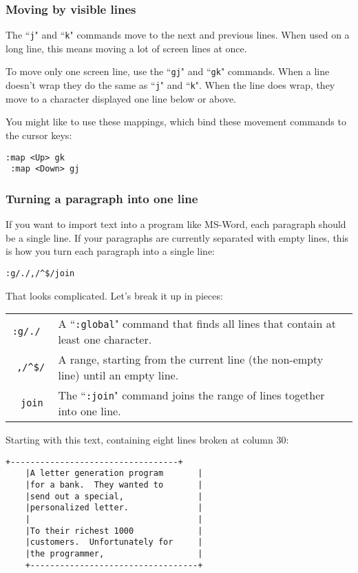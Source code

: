 \subsubsection{Moving by visible lines}
The ``\texttt{j}" and ``\texttt{k}" commands move to the next and previous lines.
When used on a long line, this means moving a lot of screen lines at once.

To move only one screen line, use the ``\texttt{gj}" and ``\texttt{gk}" commands.
When a line doesn't wrap they do the same as ``\texttt{j}" and ``\texttt{k}".
When the line does wrap, they move to a character displayed one line below or above.

You might like to use these mappings, which bind these movement commands to the cursor keys:

\begin{Verbatim}[samepage=true]
 :map <Up> gk
 :map <Down> gj
\end{Verbatim}
\subsubsection{Turning a paragraph into one line}
If you want to import text into a program like MS-Word, each paragraph should be a single line.
If your paragraphs are currently separated with empty lines, this is how you turn each paragraph into a single line:

\begin{Verbatim}[samepage=true]
 :g/./,/^$/join
\end{Verbatim}

That looks complicated.
Let's break it up in pieces:

\begin{center} \begin{tabular}{c l}
				\texttt{:g/./         } & A ``\texttt{:global}" command that finds all lines that contain at least one character. \\
				\texttt{     ,/\^{}\$/    } & A range, starting from the current line (the non-empty line) until an empty line. \\
				\texttt{          join} & The ``\texttt{:join}" command joins the range of lines together into one line. \\
\end{tabular} \end{center}

Starting with this text, containing eight lines broken at column 30:

\begin{Verbatim}[samepage=true]
    +----------------------------------+
    |A letter generation program       |
    |for a bank.  They wanted to       |
    |send out a special,               |
    |personalized letter.              |
    |                                  |
    |To their richest 1000             |
    |customers.  Unfortunately for     |
    |the programmer,                   |
    +----------------------------------+
\end{Verbatim}

